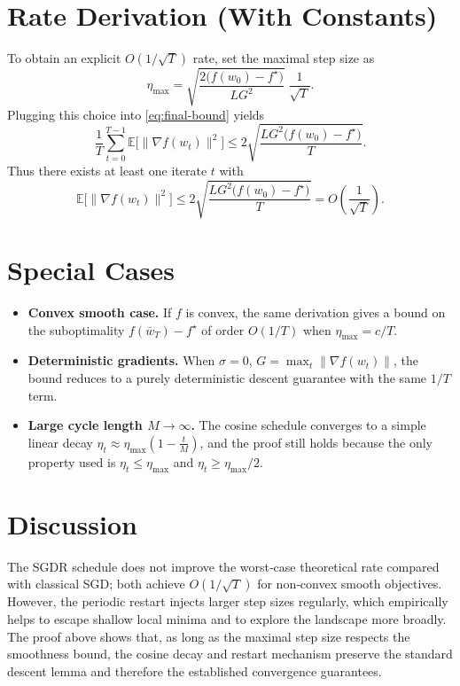 \documentclass{article}
\newcommand{\E}{\mathbb{E}}
\begin{document}
\section*{Rate Derivation (With Constants)}
To obtain an explicit $O(1/\sqrt{T})$ rate, set the maximal step size as
\[
\eta_{\max}= \sqrt{\frac{2\bigl(f(w_0)-f^\star\bigr)}{L G^2}}\; \frac{1}{\sqrt{T}} .
\]
Plugging this choice into \eqref{eq:final-bound} yields
\[
\frac{1}{T}\sum_{t=0}^{T-1}\E\bigl[\|\nabla f(w_t)\|^2\bigr]
\le 
2\sqrt{\frac{L G^2\bigl(f(w_0)-f^\star\bigr)}{T}} .
\]
Thus there exists at least one iterate $t$ with
\[
\E\bigl[\|\nabla f(w_t)\|^2\bigr]\le
2\sqrt{\frac{L G^2\bigl(f(w_0)-f^\star\bigr)}{T}}=O\!\left(\frac{1}{\sqrt{T}}\right).
\]

\section*{Special Cases}
\begin{itemize}
\item \textbf{Convex smooth case.} If $f$ is convex, the same derivation gives a bound on the suboptimality $f(\bar w_T)-f^\star$ of order $O(1/T)$ when $\eta_{\max}=c/T$.
\item \textbf{Deterministic gradients.} When $\sigma=0$, $G=\max_t\|\nabla f(w_t)\|$, the bound reduces to a purely deterministic descent guarantee with the same $1/T$ term.
\item \textbf{Large cycle length $M\to\infty$.} The cosine schedule converges to a simple linear decay $\eta_t\approx\eta_{\max}(1-\frac{t}{M})$, and the proof still holds because the only property used is $\eta_t\le\eta_{\max}$ and $\eta_t\ge\eta_{\max}/2$.
\end{itemize}

\section*{Discussion}
The SGDR schedule does not improve the worst‑case theoretical rate compared with classical SGD; both achieve $O(1/\sqrt{T})$ for non‑convex smooth objectives.  However, the periodic restart injects larger step sizes regularly, which empirically helps to escape shallow local minima and to explore the landscape more broadly.  The proof above shows that, as long as the maximal step size respects the smoothness bound, the cosine decay and restart mechanism preserve the standard descent lemma and therefore the established convergence guarantees.
\end{document}
